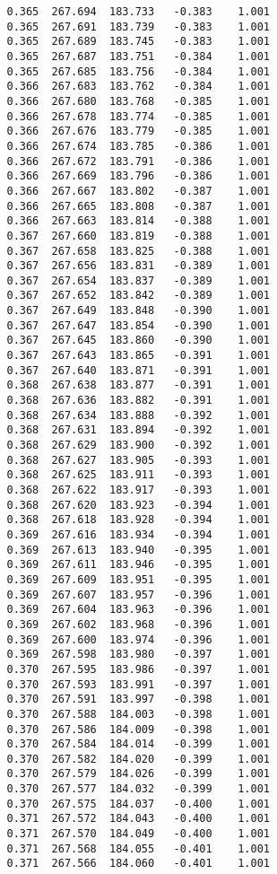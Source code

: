 \begin{verbatim}
   0.365  267.694  183.733   -0.383    1.001
   0.365  267.691  183.739   -0.383    1.001
   0.365  267.689  183.745   -0.383    1.001
   0.365  267.687  183.751   -0.384    1.001
   0.365  267.685  183.756   -0.384    1.001
   0.366  267.683  183.762   -0.384    1.001
   0.366  267.680  183.768   -0.385    1.001
   0.366  267.678  183.774   -0.385    1.001
   0.366  267.676  183.779   -0.385    1.001
   0.366  267.674  183.785   -0.386    1.001
   0.366  267.672  183.791   -0.386    1.001
   0.366  267.669  183.796   -0.386    1.001
   0.366  267.667  183.802   -0.387    1.001
   0.366  267.665  183.808   -0.387    1.001
   0.366  267.663  183.814   -0.388    1.001
   0.367  267.660  183.819   -0.388    1.001
   0.367  267.658  183.825   -0.388    1.001
   0.367  267.656  183.831   -0.389    1.001
   0.367  267.654  183.837   -0.389    1.001
   0.367  267.652  183.842   -0.389    1.001
   0.367  267.649  183.848   -0.390    1.001
   0.367  267.647  183.854   -0.390    1.001
   0.367  267.645  183.860   -0.390    1.001
   0.367  267.643  183.865   -0.391    1.001
   0.367  267.640  183.871   -0.391    1.001
   0.368  267.638  183.877   -0.391    1.001
   0.368  267.636  183.882   -0.391    1.001
   0.368  267.634  183.888   -0.392    1.001
   0.368  267.631  183.894   -0.392    1.001
   0.368  267.629  183.900   -0.392    1.001
   0.368  267.627  183.905   -0.393    1.001
   0.368  267.625  183.911   -0.393    1.001
   0.368  267.622  183.917   -0.393    1.001
   0.368  267.620  183.923   -0.394    1.001
   0.368  267.618  183.928   -0.394    1.001
   0.369  267.616  183.934   -0.394    1.001
   0.369  267.613  183.940   -0.395    1.001
   0.369  267.611  183.946   -0.395    1.001
   0.369  267.609  183.951   -0.395    1.001
   0.369  267.607  183.957   -0.396    1.001
   0.369  267.604  183.963   -0.396    1.001
   0.369  267.602  183.968   -0.396    1.001
   0.369  267.600  183.974   -0.396    1.001
   0.369  267.598  183.980   -0.397    1.001
   0.370  267.595  183.986   -0.397    1.001
   0.370  267.593  183.991   -0.397    1.001
   0.370  267.591  183.997   -0.398    1.001
   0.370  267.588  184.003   -0.398    1.001
   0.370  267.586  184.009   -0.398    1.001
   0.370  267.584  184.014   -0.399    1.001
   0.370  267.582  184.020   -0.399    1.001
   0.370  267.579  184.026   -0.399    1.001
   0.370  267.577  184.032   -0.399    1.001
   0.370  267.575  184.037   -0.400    1.001
   0.371  267.572  184.043   -0.400    1.001
   0.371  267.570  184.049   -0.400    1.001
   0.371  267.568  184.055   -0.401    1.001
   0.371  267.566  184.060   -0.401    1.001

\end{verbatim}
